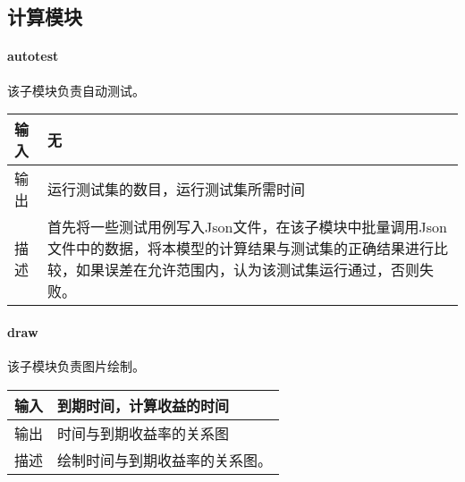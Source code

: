 \subsection{计算模块}

\paragraph{autotest} 
该子模块负责自动测试。
\begin{table}[H]
\begin{adjustwidth}{-3cm}{-3cm}
\begin{center}
\begin{tabular}{|p{}| p{}|} \hline
输入 & 无  \\ \hline
输出 & 运行测试集的数目，运行测试集所需时间  \\ \hline
描述 & 首先将一些测试用例写入Json文件，在该子模块中批量调用Json文件中的数据，将本模型的计算结果与测试集的正确结果进行比较，如果误差在允许范围内，认为该测试集运行通过，否则失败。  \\ \hline
\end{tabular}
\end{center}
\end{adjustwidth}
\end{table}


\paragraph{draw}
该子模块负责图片绘制。
\begin{table}[H]
\begin{adjustwidth}{-3cm}{-3cm}
\begin{center}
\begin{tabular}{|p{}| p{}|} \hline
输入 & 到期时间，计算收益的时间  \\ \hline
输出 & 时间与到期收益率的关系图 \\ \hline
描述 & 绘制时间与到期收益率的关系图。 \\ \hline
\end{tabular}
\end{center}
\end{adjustwidth}
\end{table}


